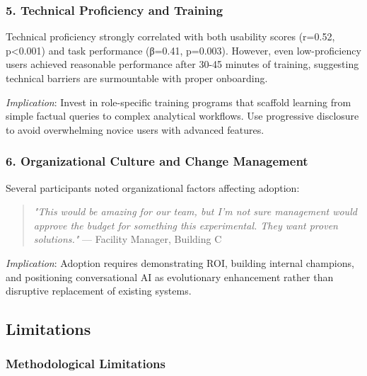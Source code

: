 \documentclass[acmlarge]{acmart}
\begin{document}
\subsubsection{5. Technical Proficiency and Training}

Technical proficiency strongly correlated with both usability scores (r=0.52, p<0.001) and task performance (β=0.41, p=0.003). However, even low-proficiency users achieved reasonable performance after 30-45 minutes of training, suggesting technical barriers are surmountable with proper onboarding.

\textit{Implication}: Invest in role-specific training programs that scaffold learning from simple factual queries to complex analytical workflows. Use progressive disclosure to avoid overwhelming novice users with advanced features.

\subsubsection{6. Organizational Culture and Change Management}

Several participants noted organizational factors affecting adoption:

\begin{quote}
\textit{"This would be amazing for our team, but I'm not sure management would approve the budget for something this experimental. They want proven solutions."} — Facility Manager, Building C
\end{quote}

\textit{Implication}: Adoption requires demonstrating ROI, building internal champions, and positioning conversational AI as evolutionary enhancement rather than disruptive replacement of existing systems.

\subsection{Limitations}

\subsubsection{Methodological Limitations}
\end{document}
